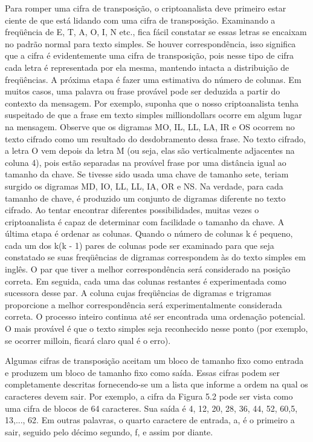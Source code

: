 Para romper uma cifra de transposição, o criptoanalista deve primeiro estar ciente de que está
lidando com uma cifra de transposição. Examinando a freqüência de E, T, A, O, I, N etc., fica fácil constatar se essas letras se encaixam no padrão normal para texto simples. Se houver
correspondência, isso significa que a cifra é evidentemente uma cifra de transposição, pois nesse tipo de cifra cada letra é representada por ela mesma, mantendo intacta a distribuição de freqüências.
A próxima etapa é fazer uma estimativa do número de colunas. Em muitos casos, uma palavra ou
frase provável pode ser deduzida a partir do contexto da mensagem. Por exemplo, suponha que o
nosso criptoanalista tenha suspeitado de que a frase em texto simples milliondollars ocorre em
algum lugar na mensagem. Observe que os digramas MO, IL, LL, LA, IR e OS ocorrem no texto
cifrado como um resultado do desdobramento dessa frase. No texto cifrado, a letra O vem depois
da letra M (ou seja, elas são verticalmente adjacentes na coluna 4), pois estão separadas na
provável frase por uma distância igual ao tamanho da chave. Se tivesse sido usada uma chave de
tamanho sete, teriam surgido os digramas MD, IO, LL, LL, IA, OR e NS. Na verdade, para cada
tamanho de chave, é produzido um conjunto de digramas diferente no texto cifrado. Ao tentar
encontrar diferentes possibilidades, muitas vezes o criptoanalista é capaz de determinar com
facilidade o tamanho da chave.
A última etapa é ordenar as colunas. Quando o número de colunas k é pequeno, cada um dos k(k -
1) pares de colunas pode ser examinado para que seja constatado se suas freqüências de digramas correspondem às do texto simples em inglês. O par que tiver a melhor correspondência será considerado na posição correta. Em seguida, cada uma das colunas restantes é experimentada como sucessora desse par. A coluna cujas freqüências de digramas e trigramas proporcione a melhor correspondência será experimentalmente considerada correta. O processo inteiro continua até ser encontrada uma ordenação potencial. O mais provável é que o texto simples seja reconhecido nesse ponto (por exemplo, se ocorrer milloin, ficará claro qual é o erro).

Algumas cifras de transposição aceitam um bloco de tamanho fixo como entrada e produzem um
bloco de tamanho fixo como saída. Essas cifras podem ser completamente descritas fornecendo-se
um a lista que informe a ordem na qual os caracteres devem sair. Por exemplo, a cifra da Figura 5.2 pode ser vista como uma cifra de blocos de 64 caracteres. Sua saída é 4, 12, 20, 28, 36, 44, 52, 60,5, 13,..., 62. Em outras palavras, o quarto caractere de entrada, a, é o primeiro a sair, seguido pelo décimo segundo, f, e assim por diante.


